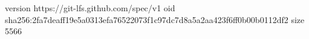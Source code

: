 version https://git-lfs.github.com/spec/v1
oid sha256:2fa7deaff19e5a0313efa76522073f1c97dc7d8a5a2aa423f6ff0b00b0112df2
size 5566
